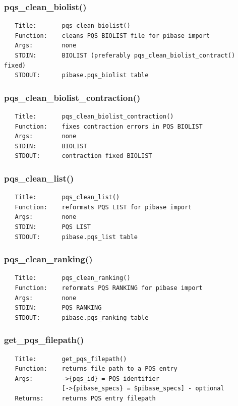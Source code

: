 \documentclass{article}
\begin{document}
\subsubsection*{pqs\_clean\_biolist()\label{pibase::PQS_pqs_clean_biolist_}}
\begin{verbatim}
   Title:       pqs_clean_biolist()
   Function:    cleans PQS BIOLIST file for pibase import
   Args:        none
   STDIN:       BIOLIST (preferably pqs_clean_biolist_contract() fixed)
   STDOUT:      pibase.pqs_biolist table
\end{verbatim}
\subsubsection*{pqs\_clean\_biolist\_contraction()\label{pibase::PQS_pqs_clean_biolist_contraction_}}
\begin{verbatim}
   Title:       pqs_clean_biolist_contraction()
   Function:    fixes contraction errors in PQS BIOLIST
   Args:        none
   STDIN:       BIOLIST
   STDOUT:      contraction fixed BIOLIST
\end{verbatim}
\subsubsection*{pqs\_clean\_list()\label{pibase::PQS_pqs_clean_list_}}
\begin{verbatim}
   Title:       pqs_clean_list()
   Function:    reformats PQS LIST for pibase import
   Args:        none
   STDIN:       PQS LIST
   STDOUT:      pibase.pqs_list table
\end{verbatim}
\subsubsection*{pqs\_clean\_ranking()\label{pibase::PQS_pqs_clean_ranking_}}
\begin{verbatim}
   Title:       pqs_clean_ranking()
   Function:    reformats PQS RANKING for pibase import
   Args:        none
   STDIN:       PQS RANKING
   STDOUT:      pibase.pqs_ranking table
\end{verbatim}
\subsubsection*{get\_pqs\_filepath()\label{pibase::PQS_get_pqs_filepath_}}
\begin{verbatim}
   Title:       get_pqs_filepath()
   Function:    returns file path to a PQS entry
   Args:        ->{pqs_id} = PQS identifier
                [->{pibase_specs} = $pibase_specs] - optional
   Returns:     returns PQS entry filepath
\end{verbatim}
\clearpage
\end{document}
